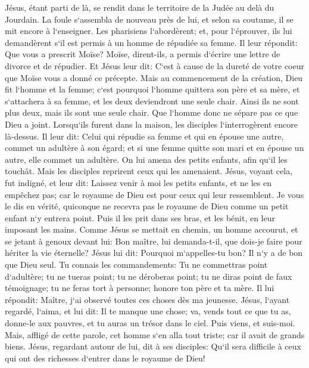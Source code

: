 \verse Jésus, étant parti de là, se rendit dans le territoire de la Judée au delà du Jourdain. La foule s`assembla de nouveau près de lui, et selon sa coutume, il se mit encore à l`enseigner. 
\verse Les pharisiens l`abordèrent; et, pour l`éprouver, ils lui demandèrent s`il est permis à un homme de répudiée sa femme. 
\verse Il leur répondit: Que vous a prescrit Moïse? 
\verse Moïse, dirent-ils, a permis d`écrire une lettre de divorce et de répudier. 
\verse Et Jésus leur dit: C`est à cause de la dureté de votre coeur que Moïse vous a donné ce précepte. 
\verse Mais au commencement de la création, Dieu fit l`homme et la femme; 
\verse c`est pourquoi l`homme quittera son père et sa mère, et s`attachera à sa femme, 
\verse et les deux deviendront une seule chair. Ainsi ils ne sont plus deux, mais ils sont une seule chair. 
\verse Que l`homme donc ne sépare pas ce que Dieu a joint. 
\verse Lorsqu`ils furent dans la maison, les disciples l`interrogèrent encore là-dessus. 
\verse Il leur dit: Celui qui répudie sa femme et qui en épouse une autre, commet un adultère à son égard; 
\verse et si une femme quitte son mari et en épouse un autre, elle commet un adultère. 
\verse On lui amena des petits enfants, afin qu`il les touchât. Mais les disciples reprirent ceux qui les amenaient. 
\verse Jésus, voyant cela, fut indigné, et leur dit: Laissez venir à moi les petits enfants, et ne les en empêchez pas; car le royaume de Dieu est pour ceux qui leur ressemblent. 
\verse Je vous le dis en vérité, quiconque ne recevra pas le royaume de Dieu comme un petit enfant n`y entrera point. 
\verse Puis il les prit dans ses bras, et les bénit, en leur imposant les mains. 
\verse Comme Jésus se mettait en chemin, un homme accourut, et se jetant à genoux devant lui: Bon maître, lui demanda-t-il, que dois-je faire pour hériter la vie éternelle? 
\verse Jésus lui dit: Pourquoi m`appelles-tu bon? Il n`y a de bon que Dieu seul. 
\verse Tu connais les commandements: Tu ne commettras point d`adultère; tu ne tueras point; tu ne déroberas point; tu ne diras point de faux témoignage; tu ne feras tort à personne; honore ton père et ta mère. 
\verse Il lui répondit: Maître, j`ai observé toutes ces choses dès ma jeunesse. 
\verse Jésus, l`ayant regardé, l`aima, et lui dit: Il te manque une chose; va, vends tout ce que tu as, donne-le aux pauvres, et tu auras un trésor dans le ciel. Puis viens, et suis-moi. 
\verse Mais, affligé de cette parole, cet homme s`en alla tout triste; car il avait de grands biens. 
\verse Jésus, regardant autour de lui, dit à ses disciples: Qu`il sera difficile à ceux qui ont des richesses d`entrer dans le royaume de Dieu! 

